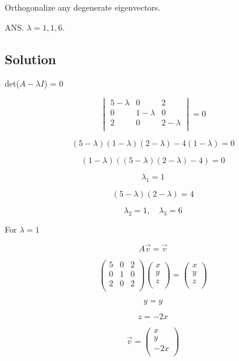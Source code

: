 \documentclass[12pt]{article}
\begin{document}
Orthogonalize any degenerate eigenvectors.

ANS. \(\lambda = 1, 1, 6. \)

\subsection{Solution}

det(\(A - \lambda I\)) = 0

\[
    \begin{vmatrix}
        5 - \lambda & 0           & 2           \\
        0           & 1 - \lambda & 0           \\
        2           & 0           & 2 - \lambda \\
    \end{vmatrix} = 0
\]

\[
    (5 - \lambda)(1 - \lambda)(2 - \lambda) - 4(1 - \lambda) = 0
\]

\[
    (1 - \lambda)((5 - \lambda)(2 - \lambda) - 4) = 0
\]

\[
    \lambda_1 = 1
\]

\[
    (5 - \lambda)(2 - \lambda) = 4
\]

\[
    \lambda_2 = 1, \quad \lambda_3 = 6
\]

For \(\lambda = 1\)

\[
    A\vec{v} = \vec{v}
\]

\[
    \begin{pmatrix}
        5 & 0 & 2 \\
        0 & 1 & 0 \\
        2 & 0 & 2 \\
    \end{pmatrix} \begin{pmatrix}
        x \\
        y \\
        z \\
    \end{pmatrix} = \begin{pmatrix}
        x \\
        y \\
        z \\
    \end{pmatrix}
\]

\[
    y = y
\]

\[
    z = -2x
\]


\[
    \vec{v} = \begin{pmatrix}
        x   \\
        y   \\
        -2x \\
    \end{pmatrix}
\]
\end{document}
